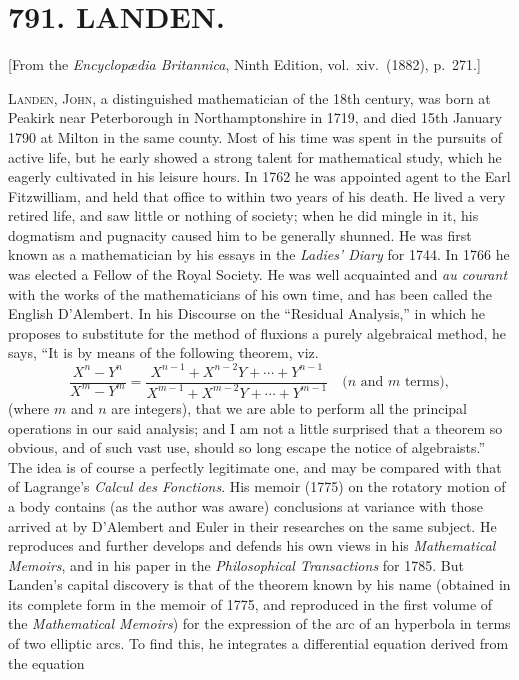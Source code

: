 \documentclass[11pt,a4paper]{book}
\begin{document}
\section*{791. LANDEN.}

\begin{flushright}
\small[From the \textit{Encyclop{\ae}dia Britannica}, Ninth Edition, vol.~xiv.~(1882), p.~271.]
\end{flushright}

\textsc{Landen, John}, a distinguished mathematician of the 18th century, was born at Peakirk near Peterborough in Northamptonshire in 1719, and died 15th January 1790 at Milton in the same county. Most of his time was spent in the pursuits of active life, but he early showed a strong talent for mathematical study, which he eagerly cultivated in his leisure hours. In 1762 he was appointed agent to the Earl Fitzwilliam, and held that office to within two years of his death. He lived a very retired life, and saw little or nothing of society; when he did mingle in it, his dogmatism and pugnacity caused him to be generally shunned. He was first known as a mathematician by his essays in the \textit{Ladies' Diary} for 1744. In 1766 he was elected a Fellow of the Royal Society. He was well acquainted and \textit{au courant} with the works of the mathematicians of his own time, and has been called the English D'Alembert. In his Discourse on the ``Residual Analysis,'' in which he proposes to substitute for the method of fluxions a purely algebraical method, he says, ``It is by means of the following theorem, viz.
\[
\frac{X^n-Y^n}{X^m-Y^m}=\frac{X^{n-1}+X^{n-2}Y+\cdots+Y^{n-1}}{X^{m-1}+X^{m-2}Y+\cdots+Y^{m-1}}\quad\text{($n$ and $m$ terms)},
\]
(where $m$ and $n$ are integers), that we are able to perform all the principal operations in our said analysis; and I am not a little surprised that a theorem so obvious, and of such vast use, should so long escape the notice of algebraists.'' The idea is of course a perfectly legitimate one, and may be compared with that of Lagrange's \textit{Calcul des Fonctions}. His memoir (1775) on the rotatory motion of a body contains (as the author was aware) conclusions at variance with those arrived at by D'Alembert and Euler in their researches on the same subject. He reproduces and further develops and defends his own views in his \textit{Mathematical Memoirs}, and in his paper in the \textit{Philosophical Transactions} for 1785. But Landen's capital discovery is that of the theorem known by his name (obtained in its complete form in the memoir of 1775, and reproduced in the first volume of the \textit{Mathematical Memoirs}) for the expression of the arc of an hyperbola in terms of two elliptic arcs. To find this, he integrates a differential equation derived from the equation
\end{document}
